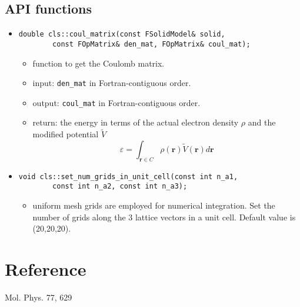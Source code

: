 \documentclass{article}
\begin{document}
\subsection{API functions}
\begin{itemize}
\item
\begin{verbatim}
double cls::coul_matrix(const FSolidModel& solid,
        const FOpMatrix& den_mat, FOpMatrix& coul_mat);
\end{verbatim}
\begin{itemize}
  \item function to get the Coulomb matrix.
  \item input: \verb$den_mat$ in Fortran-contiguous order.
  \item output: \verb$coul_mat$ in Fortran-contiguous order.
  \item return: the energy in terms of the actual electron density $\rho$ and
    the modified potential $\tilde{V}$
    \begin{equation}
      \varepsilon = \int_{\mathbf{r}\in C} \rho(\mathbf{r})\tilde{V}(\mathbf{r}) d\mathbf{r}
      \label{}
    \end{equation}
\end{itemize}
%
\item 
\begin{verbatim}
void cls::set_num_grids_in_unit_cell(const int n_a1,
        const int n_a2, const int n_a3);
\end{verbatim}
\begin{itemize}
  \item uniform mesh grids are employed for numerical integration.
    Set the number of grids along the 3 lattice vectors in a unit cell.
    Default value is (20,20,20).
\end{itemize}
\end{itemize}

\section{Reference}
Mol. Phys. 77, 629
\end{document}
